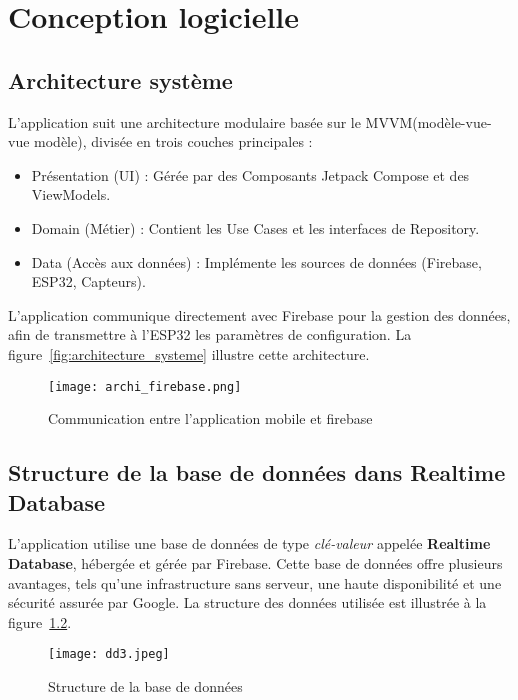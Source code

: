 \pagestyle{fancy}
\fancyhead{} %
\chapter{Conception logicielle}
\section{Architecture système}
L’application suit une architecture modulaire basée sur le MVVM(modèle-vue-vue modèle), divisée en trois couches principales :

\begin{itemize}
\item    Présentation (UI) : Gérée par des Composants Jetpack Compose et des ViewModels.
\item    Domain (Métier) : Contient les Use Cases et les interfaces de Repository.
\item    Data (Accès aux données) : Implémente les sources de données (Firebase, ESP32, Capteurs).
\end{itemize}
L'application communique directement avec Firebase pour la gestion des données, afin de transmettre à l'ESP32 les paramètres de configuration. La figure~\ref{fig:architecture_systeme} illustre cette architecture.

\begin{figure}[H]
   \centering
   \texttt{[image: archi\_firebase.png]}
   \caption{Communication entre l'application mobile et firebase}
   \label{fig:structure_de_la_base_de_donnees}
\end{figure}

\section{Structure de la base de données dans Realtime Database}

L'application utilise une base de données de type \textit{clé-valeur} appelée \textbf{Realtime Database}, hébergée et gérée par Firebase. Cette base de données offre plusieurs avantages, tels qu'une infrastructure sans serveur, une haute disponibilité et une sécurité assurée par Google. La structure des données utilisée est illustrée à la figure~\ref{fig:structure_de_la_base_de_donnees}.

\begin{figure}[H]
   \centering
   \texttt{[image: dd3.jpeg]}
   \caption{Structure de la base de données}
   \label{fig:structure_de_la_base_de_donnees}
\end{figure}

